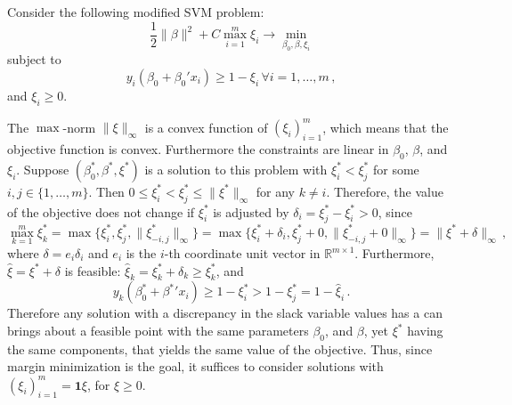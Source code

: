 \documentclass[a4paper]{article}
\newcommand{\Real}{\mathbb{R}}
\newcommand{\one}{\mathbf{1}}
\begin{document}
Consider the following modified SVM problem:
\begin{equation}
  \frac{1}{2}\|\beta\|^2 + C\max_{i=1}^m \xi_i \to \min_{\beta_0, \beta, \xi_i}
\end{equation}
subject to
\begin{equation*}
  y_i(\beta_0 + \beta_0'x_i) \geq 1 - \xi_i\, \forall i=1,\ldots, m\,,
\end{equation*}
and $\xi_i \geq 0$.

The $\max$-norm $\|\xi\|_\infty$ is a convex function of $(\xi_i)_{i=1}^m$, which
means that the objective function is convex. Furthermore the constraints are linear
in $\beta_0$, $\beta$, and $\xi_i$. Suppose $(\beta^*_0, \beta^*, \xi^*)$ is a solution
to this problem with $\xi^*_i < \xi^*_j$ for some $i, j\in\{1,\ldots, m\}$. Then
$0\leq \xi^*_i < \xi^*_j \leq \|\xi^*\|_\infty$ for any $k\neq i$. Therefore, the
value of the objective does not change if $\xi^*_i$ is adjusted by $\delta_i = \xi^*_j - \xi^*_i > 0$,
since
\begin{equation*}
  \max_{k=1}^m \xi^*_k
    = \max\{\xi^*_i, \xi^*_j, \|\xi^*_{-i,j}\|_\infty\}
    = \max\{\xi^*_i + \delta_i, \xi^*_j + 0, \|\xi^*_{-i,j} + 0\|_\infty\}
    = \|\xi^* + \delta\|_\infty \,,
\end{equation*}
where $\delta = e_i \delta_i$ and $e_i$ is the $i$-th coordinate unit vector in
$\Real^{m\times 1}$. Furthermore, $\hat{\xi} = \xi^* + \delta$ is feasible:
$\hat{\xi}_k = \xi^*_k + \delta_k \geq \xi^*_k$, and
\begin{equation*}
  y_k(\beta^*_0 + {\beta^*}'x_i)
    \geq 1 - \xi^*_i > 1 - \xi^*_j = 1 - \hat{\xi}_i \,.
\end{equation*}
Therefore any solution with a discrepancy in the slack variable values has a can
brings about a feasible point with the same parameters $\beta_0$, and $\beta$, yet
$\xi^*$ having the same components, that yields the same value of the objective.
Thus, since margin minimization is the goal, it suffices to consider solutions with
$(\xi_i)_{i=1}^m = \one \xi$, for $\xi \geq 0$.
\end{document}
